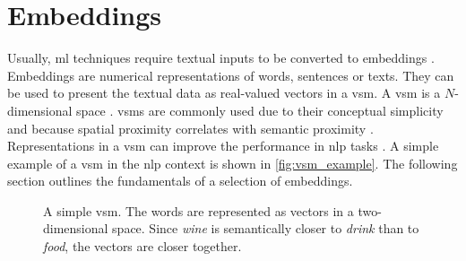 \section{Embeddings}\label{sec:embeddings}

Usually, \ac{ml} techniques require textual inputs to be converted to embeddings \cite{SentRep2014}.
Embeddings are numerical representations of words, sentences or texts.
They can be used to present the textual data as real-valued vectors in a \ac{vsm}.
A \ac{vsm} is a $N$-dimensional space \cite{soft_cosine2014}.
\acp{vsm} are commonly used due to their conceptual simplicity and because spatial proximity correlates with semantic proximity 
\cite{tfidf2008, UniversalSentEnc2018, HfsentTrans2019, Top2Vec2020}.
Representations in a \ac{vsm} can improve the performance in \ac{nlp} tasks \cite{SkipGram2013}.
A simple example of a \ac{vsm} in the \ac{nlp} context is shown in \autoref{fig:vsm_example}.
The following section outlines the fundamentals of a selection of embeddings.

\begin{figure}[!htb] %
    \centering
    
    \caption[A simple \acs*{vsm}]
    {A simple \acs*{vsm}. 
    The words are represented as vectors in a two-dimensional space.
    Since \textit{wine} is semantically closer to \textit{drink} than to \textit{food}, the vectors are closer together.
    }
    \label{fig:vsm_example}
\end{figure}












